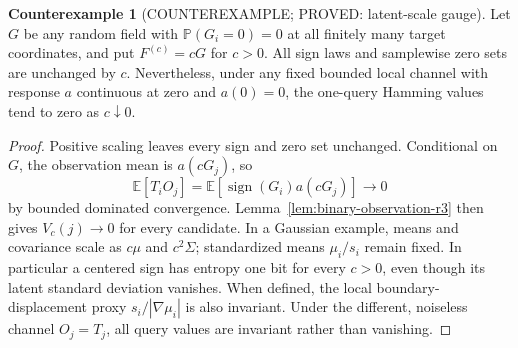 \documentclass[11pt]{article}
\theoremstyle{definition}
\newtheorem{counterexample}[theorem]{Counterexample}
\theoremstyle{remark}
\begin{document}
\begin{counterexample}[COUNTEREXAMPLE; PROVED: latent-scale gauge]
\label{ce:scale-gauge-r3}
Let $G$ be any random field with
$\mathbb{P}(G_i=0)=0$ at all finitely many target coordinates, and put
$F^{(c)}=cG$ for $c>0$. All sign laws and samplewise zero sets are
unchanged by $c$. Nevertheless, under any fixed bounded local channel
with response $a$ continuous at zero and $a(0)=0$, the one-query
Hamming values tend to zero as $c\downarrow0$.
\end{counterexample}
\begin{proof}
Positive scaling leaves every sign and zero set unchanged. Conditional
on $G$, the observation mean is $a(cG_j)$, so
\[
 \mathbb{E}[T_iO_j]
 =\mathbb{E}[\operatorname{sign}(G_i)a(cG_j)]
 \longrightarrow0
\]
by bounded dominated convergence. Lemma~\ref{lem:binary-observation-r3}
then gives $V_c(j)\to0$ for every candidate. In a Gaussian example,
means and covariance scale as $c\mu$ and $c^2\Sigma$; standardized means
$\mu_i/s_i$ remain fixed. In particular a centered sign has entropy one
bit for every $c>0$, even though its latent standard deviation vanishes.
When defined, the local boundary-displacement proxy
$s_i/|\nabla\mu_i|$ is also invariant. Under the different, noiseless
channel $O_j=T_j$, all query values are invariant rather than vanishing.
\end{proof}
\end{document}
